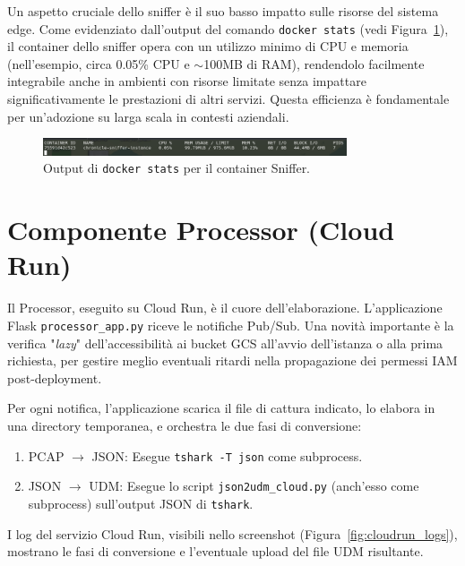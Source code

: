 \documentclass[11pt, a4paper]{article}
\begin{document}
Un aspetto cruciale dello sniffer è il suo basso impatto sulle risorse del sistema edge. Come evidenziato dall'output del comando \texttt{docker stats} (vedi Figura~\ref{fig:docker_stats}), il container dello sniffer opera con un utilizzo minimo di CPU e memoria (nell'esempio, circa 0.05\% CPU e $\sim$100MB di RAM), rendendolo facilmente integrabile anche in ambienti con risorse limitate senza impattare significativamente le prestazioni di altri servizi. Questa efficienza è fondamentale per un'adozione su larga scala in contesti aziendali.

\begin{figure}[!htbp]
    \centering
    \includegraphics[width=0.8\textwidth]{pics/DOCKER_STATS_131634.png}
    \caption{Output di \texttt{docker stats} per il container Sniffer.}
    \label{fig:docker_stats}
\end{figure} 

\section{Componente Processor (Cloud Run)}
\label{sec:processor}

Il Processor, eseguito su Cloud Run, è il cuore dell'elaborazione. L'applicazione Flask \texttt{processor\_app.py} riceve le notifiche Pub/Sub. Una novità importante è la verifica "\textit{lazy}" dell'accessibilità ai bucket GCS all'avvio dell'istanza o alla prima richiesta, per gestire meglio eventuali ritardi nella propagazione dei permessi IAM post-deployment.

Per ogni notifica, l'applicazione scarica il file di cattura indicato, lo elabora in una directory temporanea, e orchestra le due fasi di conversione:
\begin{enumerate}
    \item PCAP $\rightarrow$ JSON: Esegue \texttt{tshark -T json} come subprocess.
    \item JSON $\rightarrow$ UDM: Esegue lo script \texttt{json2udm\_cloud.py} (anch'esso come subprocess) sull'output JSON di \texttt{tshark}.
\end{enumerate}
I log del servizio Cloud Run, visibili nello screenshot (Figura~\ref{fig:cloudrun_logs}), mostrano le fasi di conversione e l'eventuale upload del file UDM risultante.
\end{document}

